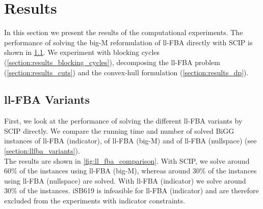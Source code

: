 \clearpage
\thispagestyle{plain}
\section{Results} \label{section:results}

In this section we present the results of the computational experiments. The performance of solving the big-M reformulation of \textsf{ll-FBA} directly with \textsf{SCIP} is shown in \cref{section:methods_ll_fba_variants}. We experiment with blocking cycles (\cref{section:results_blocking_cycles}), decomposing the ll-FBA problem (\cref{section:results_cuts}) and the convex-hull formulation (\cref{section:results_dp}).

\subsection{ll-FBA Variants} \label{section:methods_ll_fba_variants}
First, we look at the performance of solving the different ll-FBA variants by \textsf{SCIP} directly. We compare the running time and number of solved BiGG instances of \textsf{ll-FBA (indicator)}, of \textsf{ll-FBA (big-M)} and of \textsf{ll-FBA (nullspace)} (see \cref{section:llfba_variants}).\\
The results are shown in \cref{fig:ll_fba_comparison}.
With \textsf{SCIP}, we solve around $60\%$ of the instances using \textsf{ll-FBA (big-M)}, whereas around $30\%$ of the instances using \textsf{ll-FBA (nullspace)} are solved. With \textsf{ll-FBA (indicator)} we solve around $30\%$ of the instances. \textsf{iSB619} is infeasible for \textsf{ll-FBA (indicator)} and are therefore excluded from the experiments with indicator constraints. 

